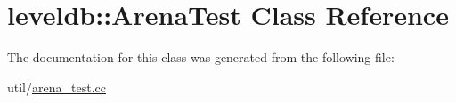 \hypertarget{classleveldb_1_1_arena_test}{\section{leveldb\-:\-:Arena\-Test Class Reference}
\label{classleveldb_1_1_arena_test}
}


The documentation for this class was generated from the following file\-:\begin{DoxyCompactItemize}
\item 
util/\hyperlink{arena__test_8cc}{arena\-\_\-test.\-cc}\end{DoxyCompactItemize}
